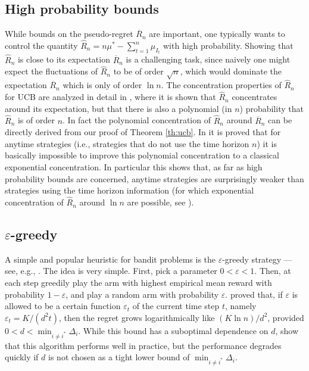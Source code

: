 \documentclass[11pt]{hackednow}
\newcommand{\oR}{\overline{R}}
\renewcommand{\epsilon}{\varepsilon}
\newcommand{\ve}{\varepsilon}
\begin{document}
\subsection{High probability bounds}
While bounds on the pseudo-regret $\oR_n$ are important, one typically wants to control the quantity $\hat{R}_n = n \mu^* - \sum_{t=1}^n \mu_{I_t}$ with high probability. Showing that $\hat{R}_n$ is close to its expectation $\oR_n$ is a challenging task, since naively one might expect the fluctuations of $\hat{R}_n$ to be of order $\sqrt{n}$, which would dominate the expectation $\oR_n$ which is only of order $\ln n$. The concentration properties of $\hat{R}_n$ for UCB are analyzed in detail in \cite{AMS09}, where it is shown that $\hat{R}_n$ concentrates around its expectation, but that there is also a polynomial (in $n$) probability that $\hat{R}_n$ is of order $n$. In fact the polynomial concentration of $\hat{R}_n$ around $\oR_n$ can be directly derived from our proof of Theorem \ref{th:ucb}. In \cite{SA11} it is proved that for anytime strategies (i.e., strategies that do not use the time horizon $n$) it is basically impossible to improve this polynomial concentration to a classical exponential concentration.
In particular this shows that, as far as high probability bounds are concerned, anytime strategies are surprisingly weaker than strategies using the time horizon information (for which exponential concentration of $\hat{R}_n$ around $\ln n$ are possible, see \cite{AMS09}). 



\subsection{$\epsilon$-greedy}
A simple and popular heuristic for bandit problems is the $\ve$-greedy strategy ---see, e.g., \cite{SB98}. The idea is very simple. First, pick a parameter $0 < \ve < 1$. Then, at each step greedily play the arm with highest empirical mean reward with probability $1-\ve$, and play a random arm with probability $\ve$. \cite{ACF02} proved that, if $\ve$ is allowed to be a certain function $\ve_t$ of the current time step $t$, namely $\ve_t = K/(d^2 t)$, then the regret grows logarithmically like $(K \ln n)/d^2$, provided $0 < d < \min_{i \neq i^*} \Delta_i$. While this bound has a suboptimal dependence on $d$, \cite{ACF02} show that this algorithm performs well in practice, but the performance degrades quickly if $d$ is not chosen as a tight lower bound of $\min_{i \neq i^*} \Delta_i$.
\end{document}
